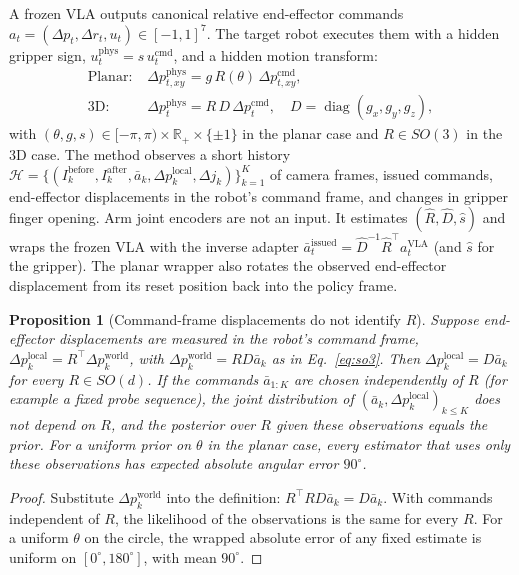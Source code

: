 \documentclass{article}
\theoremstyle{plain}
\newtheorem{proposition}{Proposition}
\theoremstyle{remark}
\begin{document}
A frozen VLA outputs canonical relative end-effector commands $a_t = (\Delta p_t, \Delta r_t, u_t) \in [-1, 1]^7$. The target robot executes them with a hidden gripper sign, $u_t^{\text{phys}} = s\, u_t^{\text{cmd}}$, and a hidden motion transform:
\begin{align}
  \text{Planar:}\; & \Delta p_{t,xy}^{\text{phys}} = g\, R(\theta)\,\Delta p_{t,xy}^{\text{cmd}}, \label{eq:so2}\\
  \text{3D:}\; & \Delta p_t^{\text{phys}} = R\, D\,\Delta p_t^{\text{cmd}},\quad D = \operatorname{diag}(g_x, g_y, g_z), \label{eq:so3}
\end{align}
with $(\theta, g, s) \in [-\pi, \pi) \times \mathbb{R}_+ \times \{\pm 1\}$ in the planar case and $R \in SO(3)$ in the 3D case. The method observes a short history $\mathcal{H} = \{(I_k^{\text{before}}, I_k^{\text{after}}, \bar{a}_k, \Delta p_k^{\text{local}}, \Delta j_k)\}_{k=1}^K$ of camera frames, issued commands, end-effector displacements in the robot's command frame, and changes in gripper finger opening. Arm joint encoders are not an input. It estimates $(\hat{R}, \hat{D}, \hat{s})$ and wraps the frozen VLA with the inverse adapter $\bar{a}_t^{\text{issued}} = \hat{D}^{-1}\hat{R}^\top a_t^{\text{VLA}}$ (and $\hat{s}$ for the gripper). The planar wrapper also rotates the observed end-effector displacement from its reset position back into the policy frame.

\begin{proposition}[Command-frame displacements do not identify $R$]
\label{prop:unident}
Suppose end-effector displacements are measured in the robot's command frame, $\Delta p_k^{\text{local}} = R^\top \Delta p_k^{\text{world}}$, with $\Delta p_k^{\text{world}} = R D \bar{a}_k$ as in Eq.~\eqref{eq:so3}. Then $\Delta p_k^{\text{local}} = D\bar{a}_k$ for every $R \in SO(d)$. If the commands $\bar{a}_{1:K}$ are chosen independently of $R$ (for example a fixed probe sequence), the joint distribution of $(\bar{a}_k, \Delta p_k^{\text{local}})_{k \le K}$ does not depend on $R$, and the posterior over $R$ given these observations equals the prior. For a uniform prior on $\theta$ in the planar case, every estimator that uses only these observations has expected absolute angular error $90^\circ$.
\end{proposition}
\begin{proof}
Substitute $\Delta p_k^{\text{world}}$ into the definition: $R^\top R D \bar{a}_k = D\bar{a}_k$. With commands independent of $R$, the likelihood of the observations is the same for every $R$. For a uniform $\theta$ on the circle, the wrapped absolute error of any fixed estimate is uniform on $[0^\circ, 180^\circ]$, with mean $90^\circ$.
\end{proof}
\end{document}
